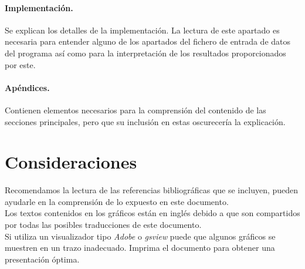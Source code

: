 \paragraph{Implementaci\'on.} Se explican los detalles de la implementaci\'on.
La lectura de este apartado es necesaria para entender alguno de los apartados
del fichero de entrada de datos del programa as\'i como para la interpretaci\'on
de los resultados proporcionados por este.

\paragraph{Ap\'endices.} Contienen elementos necesarios para la comprensi\'on
del contenido de las secciones principales, pero que su inclusi\'on en estas 
oscurecer\'ia la explicaci\'on.

\section{Consideraciones}

Recomendamos la lectura de las referencias bibliogr\'aficas que se incluyen, 
pueden ayudarle en la comprensi\'on de lo expuesto en este documento.\\

Los textos contenidos en los gr\'aficos est\'an en ingl\'es debido a que son 
compartidos por todas las posibles traducciones de este documento.\\

Si utiliza un visualizador tipo \emph{Adobe} o \emph{gsview} puede que algunos
gr\'aficos se muestren en un trazo inadecuado. Imprima el documento para obtener
una presentaci\'on \'optima.
